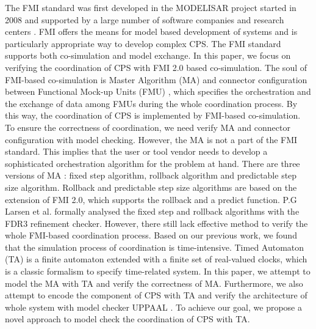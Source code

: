 The FMI standard was first developed in the MODELISAR project started in 2008 and supported by a large number of software companies and research centers \cite{ClauMODELISAR}. FMI offers the means for model based development of systems and is particularly appropriate way to develop complex CPS. The FMI standard supports both co-simulation and  model exchange. In this paper, we focus on verifying the coordination of CPS with FMI 2.0 based co-simulation.
The soul of FMI-based co-simulation is Master Algorithm (MA) \cite{AckerDVM15} and connector configuration between Functional Mock-up Units (FMU) \cite{Tripakis15}, which specifies the orchestration and the exchange of data among FMUs during the whole coordination process. By this way, the coordination of CPS is implemented by FMI-based co-simulation. To ensure the correctness of coordination, we need verify MA and connector configuration with model checking. However, the MA is not a part of the FMI standard. This implies that the user or tool vendor needs to develop a sophisticated orchestration algorithm for the problem at hand. 
There are three versions of MA \cite{BromanBGLMTW13}: fixed step algorithm, rollback algorithm and predictable step size algorithm. Rollback and predictable step size algorithms are based on the extension of FMI 2.0, which supports the rollback and a predict function. P.G Larsen et al. \cite{Larsen2016Integrated} formally analysed the fixed step and rollback algorithms with the FDR3 refinement checker. However, there still lack effective method to verify the whole FMI-based coordination process. Based on our previous work, we found that the simulation process of coordination is time-intensive. Timed Automaton (TA) \cite{BehrmannDLHPYH06} is a finite automaton extended with a finite set of real-valued clocks, which is a classic formalism to specify time-related system. In this paper, we attempt to model the MA with TA and verify the correctness of MA. Furthermore, we also attempt to encode the component of CPS with TA and verify the architecture of whole system with model checker UPPAAL \cite{BehrmannDLHPYH06}. To achieve our goal, we propose a novel approach to model check the coordination of CPS with TA.

